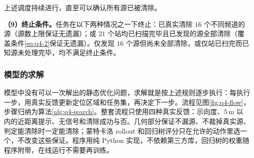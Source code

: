 上述调度持续进行，直至可以确认所有源已被清除。

\textbf{（9）终止条件。}任务在以下两种情况之一下终止：已真实清除 $16$ 个不同频道的源（源数上限保证无遗漏）；或 $21$ 个站均已扫描完毕且已发现的源全部清除（覆盖条件\eqref{eq:q4-2}保证无遗漏）。仅发现 $16$ 个源但尚未全部清除，或仅站已扫完而已知源未处理完毕，均不满足终止条件。

\subsubsection{模型的求解}\label{sec:q4-3}

模型中没有可以一次解出的静态优化问题，求解就是按上述规则逐步执行：每执行一步，用真实反馈更新定位区域和任务集，再决定下一步。流程见图\ref{fig:q4-flow}，步骤归纳为算法\ref{alg:q4-search}。整套流程只使用四种真实反馈：示向度、$5\,\mathrm{m}$ 以内的近距离提示、无信号和清除成功与否。几何部分保证不漏源、不裁掉真实源、判定能清除时一定能清除；蒙特卡洛 rollout 和回归树评分只在允许的动作里选一个，不改变这些保证。程序用纯 Python 实现，不依赖第三方库，回归树的权重随程序附带，在线运行不需要再训练。

\begin{center}
\begin{minipage}{\linewidth}
\centering
\QFourFlowFigure
{}
\label{fig:q4-flow}
\end{minipage}
\end{center}

